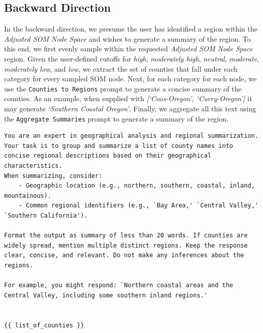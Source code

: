 \subsection{Backward Direction}
In the backward direction, we presume the user has identified a region within the \textit{Adjusted SOM Node Space} and wishes to generate a summary of the region.
%
To this end, we first evenly sample within the requested \textit{Adjusted SOM Node Space} region.
%
Given the user-defined cutoffs for \textit{high}, \textit{moderately high}, \textit{neutral}, \textit{moderate}, \textit{moderately low}, and \textit{low}, we extract the set of counties that fall under each category for every sampled SOM node.
%
Next, for each category for each node, we use the \texttt{Counties to Regions} prompt to generate a concise summary of the counties.
%
As an example, when supplied with \textit{[`Coos-Oregon', `Curry-Oregon']} it may generate \textit{`Southern Coastal Oregon'}.
%
Finally, we aggregate all this text using the \texttt{Aggregate Summaries} prompt to generate a summary of the region.
%
\begin{tcolorbox}[title=PROMPT: Counties to Regions, width=\linewidth, colframe=navy]
    \begin{lstlisting}[basicstyle=\ttfamily\footnotesize,breaklines=true, columns=fullflexible,showstringspaces=false, keepspaces=false, belowskip=0pt, aboveskip=0pt,breakindent=0pt] 
You are an expert in geographical analysis and regional summarization. Your task is to group and summarize a list of county names into concise regional descriptions based on their geographical characteristics.
When summarizing, consider:
    - Geographic location (e.g., northern, southern, coastal, inland, mountainous).
    - Common regional identifiers (e.g., `Bay Area,' `Central Valley,' `Southern California').

Format the output as summary of less than 20 words. If counties are widely spread, mention multiple distinct regions. Keep the response clear, concise, and relevant. Do not make any inferences about the regions.

For example, you might respond: `Northern coastal areas and the Central Valley, including some southern inland regions.' 


{{ list_of_counties }}\end{lstlisting}
\end{tcolorbox}
%
